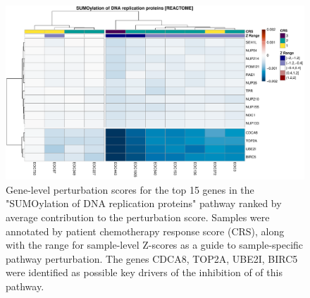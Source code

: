 \documentclass[9pt,a4paper,]{extarticle}
\newenvironment{Shaded}{\begin{snugshade}}{\end{snugshade}}
\newcommand{\AttributeTok}[1]{\textcolor[rgb]{0.13,0.29,0.53}{#1}}
\newcommand{\DecValTok}[1]{\textcolor[rgb]{0.00,0.00,0.81}{#1}}
\newcommand{\FloatTok}[1]{\textcolor[rgb]{0.00,0.00,0.81}{#1}}
\newcommand{\FunctionTok}[1]{\textcolor[rgb]{0.13,0.29,0.53}{\textbf{#1}}}
\newcommand{\NormalTok}[1]{#1}
\newcommand{\SpecialCharTok}[1]{\textcolor[rgb]{0.81,0.36,0.00}{\textbf{#1}}}
\newcommand{\StringTok}[1]{\textcolor[rgb]{0.31,0.60,0.02}{#1}}
\begin{document}
\begin{Shaded}
\end{Shaded}

\begin{figure}

{\centering \includegraphics[width=1\linewidth]{sSNAPPY_paper_files/figure-latex/Figure7-1} 

}

\caption{Gene-level perturbation scores for the top 15 genes in the "SUMOylation of DNA replication proteins" pathway ranked by average contribution to the perturbation score. Samples were annotated by patient chemotherapy response score (CRS), along with the range for sample-level Z-scores as a guide to sample-specific pathway perturbation. The genes CDCA8, TOP2A, UBE2I, BIRC5 were identified as possible key drivers of the inhibition of of this pathway.}\label{fig:Figure7}
\end{figure}
\end{document}
